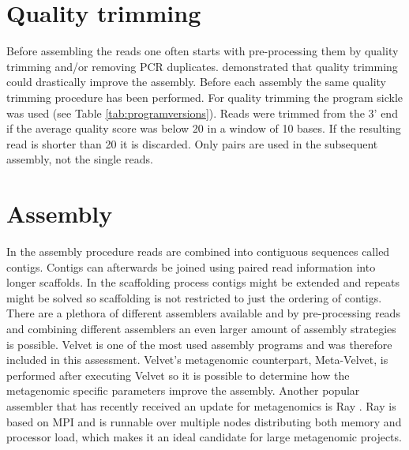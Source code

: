 \documentclass[a4paper,12pt]{report}
\begin{document}

\section{Quality trimming} Before assembling the reads one often starts with
pre-processing them by quality trimming and/or removing PCR duplicates.
\citet{Mende22384016} demonstrated that quality trimming could drastically
improve the assembly. Before each assembly the same quality trimming procedure
has been performed. For quality trimming the program sickle was used (see Table
\ref{tab:programversions}). Reads were trimmed from the 3' end if the average
quality score was below 20 in a window of 10 bases. If the resulting read is
shorter than 20 it is discarded. Only pairs are used in the subsequent
assembly, not the single reads.


\section{Assembly} In the assembly procedure reads are combined into
contiguous sequences called contigs. Contigs can afterwards be joined using
paired read information into longer scaffolds. In the scaffolding process
contigs might be extended and repeats might be solved so scaffolding is not
restricted to just the ordering of contigs.\\


There are a plethora of different assemblers available and by pre-processing
reads and combining different assemblers an even larger amount of assembly
strategies is possible. Velvet is one of the most used assembly programs and
was therefore included in this assessment. Velvet's metagenomic counterpart,
Meta-Velvet, is performed after executing Velvet so it is possible to determine
how the metagenomic specific parameters improve the assembly. Another popular
assembler that has recently received an update for metagenomics is Ray
\cite{Boisvert23259615}. Ray is based on MPI and is runnable over multiple
nodes distributing both memory and processor load, which makes it an ideal
candidate for large metagenomic projects.\\
\end{document}
